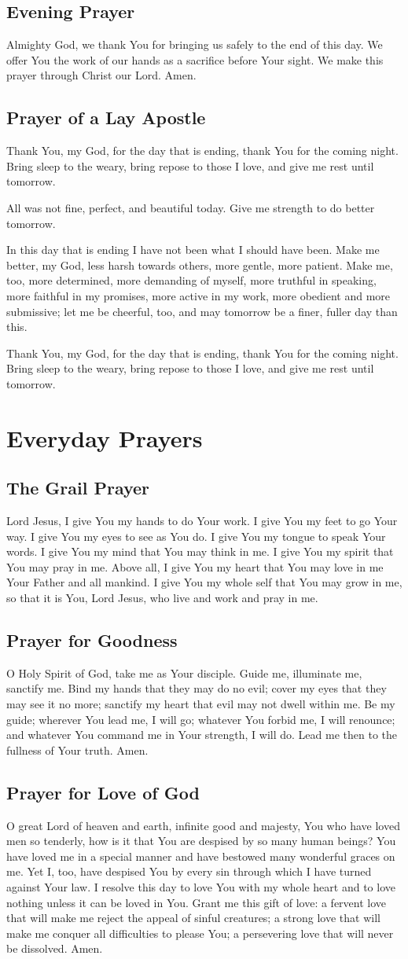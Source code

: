 \documentclass[12pt]{article}
\newcommand{\prayersection}[1]{\section{#1}}
\newcommand{\prayertitle}[1]{\subsection{#1}}
\begin{document}
\prayertitle{Evening Prayer}
Almighty God, we thank You for bringing us safely to the end of this day.
We offer You the work of our hands as a sacrifice before Your sight.
We make this prayer through Christ our Lord.
Amen.

\prayertitle{Prayer of a Lay Apostle}
\label{prayer:lay_apostle}
Thank You, my God, for the day that is ending, thank You for the coming night.
Bring sleep to the weary, bring repose to those I love, and give me rest until tomorrow.

All was not fine, perfect, and beautiful today.
Give me strength to do better tomorrow.

In this day that is ending I have not been what I should have been.
Make me better, my God, less harsh towards others, more gentle, more patient.
Make me, too, more determined, more demanding of myself, more truthful in speaking, more faithful in my promises, more active in my work, more obedient and more submissive;
let me be cheerful, too, and may tomorrow be a finer, fuller day than this.

Thank You, my God, for the day that is ending, thank You for the coming night.
Bring sleep to the weary, bring repose to those I love, and give me rest until tomorrow.

\prayersection{Everyday Prayers}
\prayertitle{The Grail Prayer}
Lord Jesus,
I give You my hands to do Your work.
I give You my feet to go Your way.
I give You my eyes to see as You do.
I give You my tongue to speak Your words.
I give You my mind that You may think in me.
I give You my spirit that You may pray in me.
Above all, I give You my heart that You may love in me Your Father and all mankind.
I give You my whole self that You may grow in me, so that it is You, Lord Jesus,
who live and work and pray in me.

\prayertitle{Prayer for Goodness}
O Holy Spirit of God, take me as Your disciple.
Guide me, illuminate me, sanctify me.
Bind my hands that they may do no evil;
cover my eyes that they may see it no more;
sanctify my heart that evil may not dwell within me.
Be my guide;
wherever You lead me, I will go;
whatever You forbid me, I will renounce;
and whatever You command me in Your strength, I will do.
Lead me then to the fullness of Your truth.
Amen.

\prayertitle{Prayer for Love of God}
O great Lord of heaven and earth, infinite good and majesty, You who have loved men so tenderly, how is it that You are despised by so many human beings?
You have loved me in a special manner and have bestowed many wonderful graces on me.
Yet I, too, have despised You by every sin through which I have turned against Your law.
I resolve this day to love You with my whole heart and to love nothing unless it can be loved in You.
Grant me this gift of love:
a fervent love that will make me reject the appeal of sinful creatures;
a strong love that will make me conquer all difficulties to please You;
a persevering love that will never be dissolved.
Amen.
\end{document}
